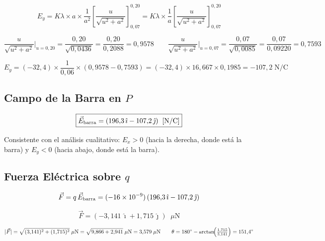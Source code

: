 \documentclass[12pt,letterpaper]{article}
\begin{document}
\begin{equation*}
    E_y = K\lambda\times a\times\frac{1}{a^2}\left[\frac{u}{\sqrt{u^2+a^2}}\right]_{0{,}07}^{0{,}20}
    = K\lambda\times\frac{1}{a}\left[\frac{u}{\sqrt{u^2+a^2}}\right]_{0{,}07}^{0{,}20}
\end{equation*}

\begin{equation*}
    \frac{u}{\sqrt{u^2+a^2}}\Bigg|_{u=0{,}20} = \frac{0{,}20}{\sqrt{0{,}0436}} = \frac{0{,}20}{0{,}2088} = 0{,}9578
    \qquad
    \frac{u}{\sqrt{u^2+a^2}}\Bigg|_{u=0{,}07} = \frac{0{,}07}{\sqrt{0{,}0085}} = \frac{0{,}07}{0{,}09220} = 0{,}7593
\end{equation*}

\begin{equation*}
    E_y = (-32{,}4)\times\frac{1}{0{,}06}\times(0{,}9578-0{,}7593)
    = (-32{,}4)\times16{,}667\times0{,}1985 = -107{,}2\;\text{N/C}
\end{equation*}

\subsection*{Campo de la Barra en $P$}

\begin{equation*}
    \boxed{\vec{E}_{\rm barra} = (196{,}3\,\hat{\imath}-107{,}2\,\hat{\jmath})\;\;[\text{N/C}]}
\end{equation*}

Consistente con el an\'alisis cualitativo: $E_x > 0$ (hacia la derecha, donde est\'a la barra)
y $E_y < 0$ (hacia abajo, donde est\'a la barra).

\subsection*{Fuerza El\'ectrica sobre $q$}

\begin{equation*}
    \vec{F} = q\,\vec{E}_{\rm barra}
    = (-16\times10^{-9})\,(196{,}3\,\hat{\imath}-107{,}2\,\hat{\jmath})
\end{equation*}

\begin{equation*}
    \boxed{\vec{F} = (-3{,}141\,\hat{\imath}+1{,}715\,\hat{\jmath})\;\;\mu\text{N}}
\end{equation*}

\begin{equation*}
    |\vec{F}| = \sqrt{(3{,}141)^2+(1{,}715)^2}\;\mu\text{N}
    = \sqrt{9{,}866+2{,}941}\;\mu\text{N} = 3{,}579\;\mu\text{N}
    \qquad
    \theta = 180^\circ - \arctan\!\Bigl(\tfrac{1{,}715}{3{,}141}\Bigr) = 151{,}4^\circ
\end{equation*}
\end{document}

